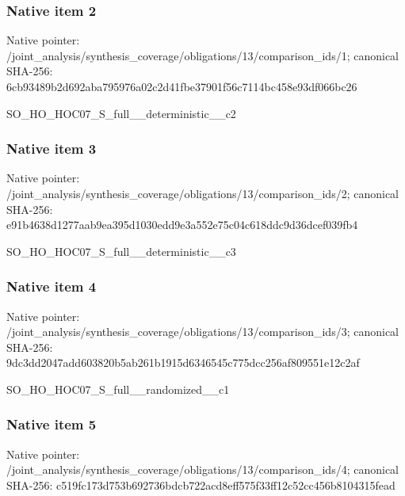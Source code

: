 \documentclass[10pt,a4paper]{article}
\begin{document}
\subsubsection{Native item 2}
Native pointer: /joint\_\allowbreak{}analysis/synthesis\_\allowbreak{}coverage/obligations/13/comparison\_\allowbreak{}ids/1; canonical SHA-256: 6cb93489b2d692aba795976a02c2d41fbe37901f56c7114bc458e93df066bc26

\begingroup\raggedright\sloppy SO\_\allowbreak{}HO\_\allowbreak{}HOC07\_\allowbreak{}S\_\allowbreak{}full\_\allowbreak{}\_\allowbreak{}deterministic\_\allowbreak{}\_\allowbreak{}c2\par\endgroup

\subsubsection{Native item 3}
Native pointer: /joint\_\allowbreak{}analysis/synthesis\_\allowbreak{}coverage/obligations/13/comparison\_\allowbreak{}ids/2; canonical SHA-256: e91b4638d1277aab9ea395d1030edd9e3a552e75c04c618ddc9d36dcef039fb4

\begingroup\raggedright\sloppy SO\_\allowbreak{}HO\_\allowbreak{}HOC07\_\allowbreak{}S\_\allowbreak{}full\_\allowbreak{}\_\allowbreak{}deterministic\_\allowbreak{}\_\allowbreak{}c3\par\endgroup

\subsubsection{Native item 4}
Native pointer: /joint\_\allowbreak{}analysis/synthesis\_\allowbreak{}coverage/obligations/13/comparison\_\allowbreak{}ids/3; canonical SHA-256: 9dc3dd2047add603820b5ab261b1915d6346545c775dcc256af809551e12c2af

\begingroup\raggedright\sloppy SO\_\allowbreak{}HO\_\allowbreak{}HOC07\_\allowbreak{}S\_\allowbreak{}full\_\allowbreak{}\_\allowbreak{}randomized\_\allowbreak{}\_\allowbreak{}c1\par\endgroup

\subsubsection{Native item 5}
Native pointer: /joint\_\allowbreak{}analysis/synthesis\_\allowbreak{}coverage/obligations/13/comparison\_\allowbreak{}ids/4; canonical SHA-256: c519fc173d753b692736bdcb722acd8eff575f33ff12c52cc456b8104315fead
\end{document}

